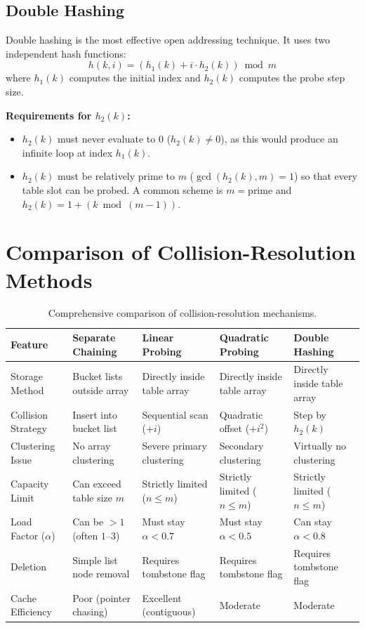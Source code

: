 \subsection{Double Hashing}
Double hashing is the most effective open addressing technique. It uses two independent hash functions:
\[
\boxed{h(k, i) = (h_1(k) + i \cdot h_2(k)) \bmod m}
\]
where $h_1(k)$ computes the initial index and $h_2(k)$ computes the probe step size.

\textbf{Requirements for $h_2(k)$:}
\begin{itemize}
    \item $h_2(k)$ must never evaluate to $0$ ($h_2(k) \neq 0$), as this would produce an infinite loop at index $h_1(k)$.
    \item $h_2(k)$ must be relatively prime to $m$ ($\gcd(h_2(k), m) = 1$) so that every table slot can be probed. A common scheme is $m = \text{prime}$ and $h_2(k) = 1 + (k \bmod (m - 1))$.
\end{itemize}

\section{Comparison of Collision-Resolution Methods}

\begin{table}[htbp]
\centering
\footnotesize
\begin{tabularx}{\textwidth}{p{2.5cm} X X X X}
\toprule
\textbf{Feature} & \textbf{Separate Chaining} & \textbf{Linear Probing} & \textbf{Quadratic Probing} & \textbf{Double Hashing} \\
\midrule
Storage Method & Bucket lists outside array & Directly inside table array & Directly inside table array & Directly inside table array \\
Collision Strategy & Insert into bucket list & Sequential scan ($+i$) & Quadratic offset ($+i^2$) & Step by $h_2(k)$ \\
Clustering Issue & No array clustering & Severe primary clustering & Secondary clustering & Virtually no clustering \\
Capacity Limit & Can exceed table size $m$ & Strictly limited ($n \leq m$) & Strictly limited ($n \leq m$) & Strictly limited ($n \leq m$) \\
Load Factor ($\alpha$) & Can be $> 1$ (often $1$--$3$) & Must stay $\alpha < 0.7$ & Must stay $\alpha < 0.5$ & Can stay $\alpha < 0.8$ \\
Deletion & Simple list node removal & Requires tombstone flag & Requires tombstone flag & Requires tombstone flag \\
Cache Efficiency & Poor (pointer chasing) & Excellent (contiguous) & Moderate & Moderate \\
\bottomrule
\end{tabularx}
\caption{Comprehensive comparison of collision-resolution mechanisms.}
\end{table}

